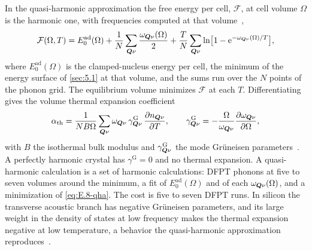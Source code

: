 In the quasi-harmonic approximation the free energy per cell, $\mathcal{F}$, at cell volume $\Omega$ is the harmonic one, with frequencies computed at that volume~\cite[Eq.~(4)]{baroni2010thermal},
\begin{equation}
  \mathcal{F}(\Omega,T) = E^{\mathrm{ad}}_0(\Omega) + \frac1N\sum_{\bm{Q}\nu}\frac{\omega_{\bm{Q}\nu}(\Omega)}{2} + \frac TN\sum_{\bm{Q}\nu}\ln\bigl[1 - \mathrm{e}^{-\omega_{\bm{Q}\nu}(\Omega)/T}\bigr] ,
  \label{eq:E.8-qha}
\end{equation}
where $E^{\mathrm{ad}}_0(\Omega)$ is the clamped-nucleus energy per cell, the minimum of the energy surface of \cref{sec:5.1} at that volume, and the sums run over the $N$ points of the phonon grid. The equilibrium volume minimizes $\mathcal{F}$ at each $T$. Differentiating gives the volume thermal expansion coefficient
\begin{equation}
  \alpha_{\mathrm{th}} = \frac{1}{N B\Omega}\sum_{\bm{Q}\nu}\omega_{\bm{Q}\nu}\,\gamma^{\mathrm{G}}_{\bm{Q}\nu}\,\frac{\partial n_{\bm{Q}\nu}}{\partial T}, \qquad
  \gamma^{\mathrm{G}}_{\bm{Q}\nu} = -\frac{\Omega}{\omega_{\bm{Q}\nu}}\frac{\partial\omega_{\bm{Q}\nu}}{\partial\Omega} ,
  \label{eq:E.8-beta}
\end{equation}
with $B$ the isothermal bulk modulus and $\gamma^{\mathrm{G}}_{\bm{Q}\nu}$ the mode Grüneisen parameters~\cite[Eqs.~(6) and~(9)]{baroni2010thermal}. A perfectly harmonic crystal has $\gamma^{\mathrm{G}} = 0$ and no thermal expansion. A quasi-harmonic calculation is a set of harmonic calculations: DFPT phonons at five to seven volumes around the minimum, a fit of $E^{\mathrm{ad}}_0(\Omega)$ and of each $\omega_{\bm{Q}\nu}(\Omega)$, and a minimization of \cref{eq:E.8-qha}. The cost is five to seven DFPT runs. In silicon the transverse acoustic branch has negative Grüneisen parameters, and its large weight in the density of states at low frequency makes the thermal expansion negative at low temperature, a behavior the quasi-harmonic approximation reproduces~\cite[Sect.~5.1]{baroni2010thermal}.

